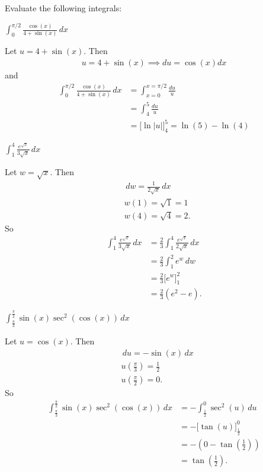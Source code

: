\documentclass[handout, nooutcomes]{ximera}
\renewenvironment{freeResponse}{
\ifhandout\setbox0\vbox\bgroup\else
\begin{trivlist}\item[\hskip \labelsep\bfseries Solution:\hspace{2ex}]
\fi}
{\ifhandout\egroup\else
\end{trivlist}
\fi}
\renewcommand{\d}{\,d}
\newcommand{\eval}[1]{\bigg[ #1 \bigg]}
\begin{document}
\begin{problem}
Evaluate the following integrals:

	\begin{enumerate}
    \item $\int_0^{\pi/2} \frac{\cos(x)}{4 + \sin(x)} \d x$
    \begin{freeResponse}
      Let $u = 4 + \sin(x)$.
      Then
      \begin{align*}
        u = 4 + \sin(x) \implies du = \cos(x) dx
      \end{align*}
      and
      \begin{align*}
       \int_0^{\pi/2} \frac{\cos(x)}{4 + \sin(x)} \d x
       &= \int_{x = 0}^{x = \pi/2} \frac{du}{u} \\
       &= \int_{4}^{5} \frac{du}{u}\\
       &= \eval{\ln|u|}_4^5 = \ln(5) - \ln(4)
      \end{align*}
    \end{freeResponse}
	\item  $\int_1^4 \frac{e^{\sqrt{x}}}{3\sqrt{x}} \d x$
		\begin{freeResponse}
		Let $w=\sqrt{x}$.  Then
			\begin{align*}
			&\d w = \frac{1}{2 \sqrt{x}} \d x  \\
			&w(1) = \sqrt{1} = 1  \\
			&w(4) = \sqrt{4} = 2.
			\end{align*}
		So
			\begin{align*}
			\int_1^4 \frac{e^{\sqrt{x}}}{3\sqrt{x}} \d x &= \frac{2}{3} \int_1^4 \frac{e^{\sqrt{x}}}{2\sqrt{x}} \d x  \\
			&= \frac{2}{3} \int_1^2 e^w \d w  \\
			&= \frac{2}{3} \eval{e^w}_1^2  \\
			&= \frac{2}{3} (e^2 - e).
			\end{align*}
		\end{freeResponse}

	\item  $\int_{\frac{\pi}{3}}^{\frac{\pi}{2}} \sin(x) \sec^2(\cos(x)) \d x$
		\begin{freeResponse}
		Let $u=\cos(x)$.  Then
			\begin{align*}
			&\d u = -\sin(x) \d x  \\
			&u\left( \frac{\pi}{3} \right) = \frac{1}{2}  \\
			&u\left( \frac{\pi}{2} \right) = 0.
			\end{align*}
		So
			\begin{align*}
			\int_{\frac{\pi}{3}}^{\frac{\pi}{2}} \sin(x) \sec^2(\cos(x)) \d x &= - \int_{\frac{1}{2}}^0 \sec^2(u) \d u   \\
			&= - \eval{\tan(u)}_{\frac{1}{2}}^0  \\
			&=  -\left( 0 - \tan\left( \frac{1}{2} \right) \right)  \\
			&= \tan \left( \frac{1}{2} \right).
			\end{align*}
		\end{freeResponse}
	\end{enumerate}
\end{problem}
\end{document}
